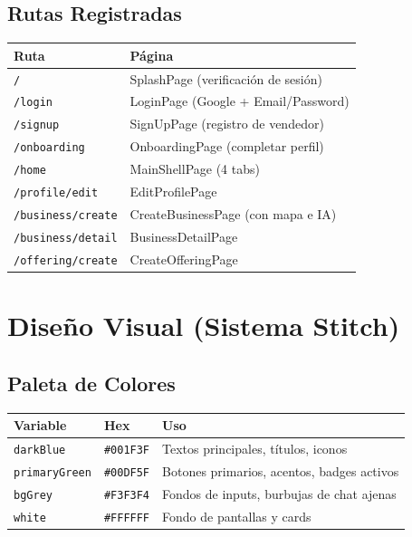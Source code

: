 \documentclass[12pt,a4paper]{article}
\begin{document}
\subsection{Rutas Registradas}

\begin{tabularx}{\textwidth}{lX}
\toprule
\textbf{Ruta} & \textbf{P\'agina} \\
\midrule
\texttt{/} & SplashPage (verificaci\'on de sesi\'on) \\
\texttt{/login} & LoginPage (Google + Email/Password) \\
\texttt{/signup} & SignUpPage (registro de vendedor) \\
\texttt{/onboarding} & OnboardingPage (completar perfil) \\
\texttt{/home} & MainShellPage (4 tabs) \\
\texttt{/profile/edit} & EditProfilePage \\
\texttt{/business/create} & CreateBusinessPage (con mapa e IA) \\
\texttt{/business/detail} & BusinessDetailPage \\
\texttt{/offering/create} & CreateOfferingPage \\
\bottomrule
\end{tabularx}

\section{Dise\~no Visual (Sistema Stitch)}

\subsection{Paleta de Colores}

\begin{tabularx}{\textwidth}{llX}
\toprule
\textbf{Variable} & \textbf{Hex} & \textbf{Uso} \\
\midrule
\texttt{darkBlue} & \texttt{\#001F3F} & Textos principales, t\'itulos, iconos \\
\texttt{primaryGreen} & \texttt{\#00DF5F} & Botones primarios, acentos, badges activos \\
\texttt{bgGrey} & \texttt{\#F3F3F4} & Fondos de inputs, burbujas de chat ajenas \\
\texttt{white} & \texttt{\#FFFFFF} & Fondo de pantallas y cards \\
\bottomrule
\end{tabularx}
\end{document}

